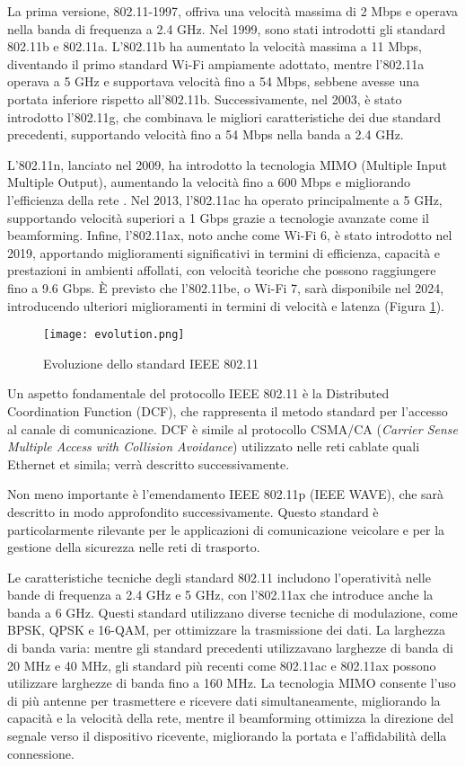 La prima versione, 802.11-1997, offriva una velocità massima di 2 Mbps e operava nella banda di frequenza a 2.4 GHz. Nel 1999, sono stati introdotti gli standard 802.11b e 802.11a. L'802.11b ha aumentato la velocità massima a 11 Mbps, diventando il primo standard Wi-Fi ampiamente adottato, mentre l'802.11a operava a 5 GHz e supportava velocità fino a 54 Mbps, sebbene avesse una portata inferiore rispetto all'802.11b. Successivamente, nel 2003, è stato introdotto l'802.11g, che combinava le migliori caratteristiche dei due standard precedenti, supportando velocità fino a 54 Mbps nella banda a 2.4 GHz.

L'802.11n, lanciato nel 2009, ha introdotto la tecnologia MIMO (Multiple Input Multiple Output), aumentando la velocità fino a 600 Mbps e migliorando l'efficienza della rete \cite{evolution}. Nel 2013, l'802.11ac ha operato principalmente a 5 GHz, supportando velocità superiori a 1 Gbps grazie a tecnologie avanzate come il beamforming. Infine, l'802.11ax, noto anche come Wi-Fi 6, è stato introdotto nel 2019, apportando miglioramenti significativi in termini di efficienza, capacità e prestazioni in ambienti affollati, con velocità teoriche che possono raggiungere fino a 9.6 Gbps. È previsto che l'802.11be, o Wi-Fi 7, sarà disponibile nel 2024, introducendo ulteriori miglioramenti in termini di velocità e latenza (Figura \ref{fig:evo}).

\begin{figure}[h!]
    \centering
    \texttt{[image: evolution.png]}
    \caption{Evoluzione dello standard IEEE 802.11}
    \label{fig:evo}
\end{figure}

Un aspetto fondamentale del protocollo IEEE 802.11 è la Distributed Coordination Function (DCF), che rappresenta il metodo standard per l'accesso al canale di comunicazione. DCF è simile al protocollo CSMA/CA (\textit{Carrier Sense Multiple Access with Collision Avoidance}) utilizzato nelle reti cablate quali Ethernet et simila; verrà descritto successivamente.

Non meno importante è l'emendamento IEEE 802.11p (IEEE WAVE), che sarà descritto in modo approfondito successivamente. Questo standard è particolarmente rilevante per le applicazioni di comunicazione veicolare e per la gestione della sicurezza nelle reti di trasporto.

Le caratteristiche tecniche degli standard 802.11 includono l'operatività nelle bande di frequenza a 2.4 GHz e 5 GHz, con l'802.11ax che introduce anche la banda a 6 GHz. Questi standard utilizzano diverse tecniche di modulazione, come BPSK, QPSK e 16-QAM, per ottimizzare la trasmissione dei dati. La larghezza di banda varia: mentre gli standard precedenti utilizzavano larghezze di banda di 20 MHz e 40 MHz, gli standard più recenti come 802.11ac e 802.11ax possono utilizzare larghezze di banda fino a 160 MHz. La tecnologia MIMO consente l'uso di più antenne per trasmettere e ricevere dati simultaneamente, migliorando la capacità e la velocità della rete, mentre il beamforming ottimizza la direzione del segnale verso il dispositivo ricevente, migliorando la portata e l'affidabilità della connessione.

